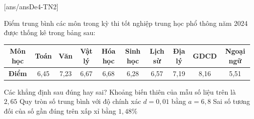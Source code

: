 \TNTF
{}[ans/ansDe4-TN2]
\begin{ex}%
	Điểm trung bình các môn trong kỳ thi tốt nghiệp trung học phổ thông năm 2024 được thống kê trong bảng sau:
	\begin{center}
		\begin{tabular}{|c|c|c|c|c|c|c|c|c|c|}
			\hline
			\textbf{Môn học} & Toán & Văn  & Vật lý & Hóa học & Sinh học & Lịch sừ & Địa lý & GDCD & Ngoại ngữ \\
			\hline
			\textbf{Điểm}    & 6,45 & 7,23 & 6,67   & 6,68    & 6,28     & 6,57    & 7,19   & 8,16 & 5,51      \\
			\hline
		\end{tabular}
	\end{center}
	Các khẳng định sau đúng hay sai?
	{\True Khoảng biến thiên của mẫu số liệu trên là $2{,}65$}
	{\True Quy tròn số trung bình với độ chính xác $d=0{,}01$ bằng $a=6{,}8$}
	{Sai số tương đối của số gần đúng trên xấp xỉ bằng $1,48\%$}
\end{ex}

